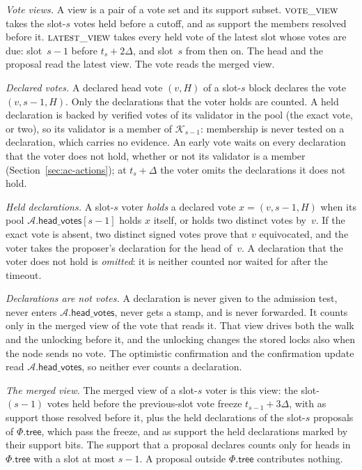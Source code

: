 \documentclass{article}
\newcommand{\committee}{\mathcal K}
\newcommand{\AC}{\mathcal A}
\newcommand{\Fr}{\Phi}
\newcommand{\tree}{\mathsf{tree}}
\newcommand{\headVotes}{\mathsf{head\_votes}}
\begin{document}
\emph{Vote views.}  A view is a pair of a vote set and its support subset.
$\Call{vote\_view}{}$ takes the slot-$s$ votes held before a cutoff, and as
support the members resolved before it.  $\Call{latest\_view}{}$ takes every
held vote of the latest slot whose votes are due: slot~$s-1$ before
$t_s+2\Delta$, and slot~$s$ from then on.  The head and the proposal read
the latest view.  The vote reads the merged view.

\emph{Declared votes.}  A declared head vote $(v,H)$ of a slot-$s$ block
declares the vote $(v,s-1,H)$.  Only the declarations that the voter holds
are counted.  A held declaration is backed by verified votes of its
validator in the pool (the exact vote, or two), so its validator is a member
of $\committee_{s-1}$: membership is never tested on a declaration, which
carries no evidence.  An early vote waits on
every declaration that the voter does not hold, whether or not its validator
is a member (Section~\ref{sec:ac-actions}); at $t_s+\Delta$ the voter omits
the declarations it does not hold.

\emph{Held declarations.}  A slot-$s$ voter \emph{holds} a declared vote
$x=(v,s-1,H)$ when its pool $\AC.\headVotes[s-1]$ holds $x$ itself, or holds
two distinct votes by~$v$.  If the exact vote is absent, two distinct
signed votes prove that $v$ equivocated, and the voter takes the
proposer's declaration for the head of~$v$.  A declaration that the
voter does not hold is \emph{omitted}: it is neither counted nor waited
for after the timeout.

\emph{Declarations are not votes.}  A declaration is never given to the
admission test, never enters $\AC.\headVotes$, never gets a stamp, and is
never forwarded.  It counts only in the merged view of the vote that reads
it.  That view drives both the walk and the unlocking before it, and the
unlocking changes the stored locks also when the node sends no vote.  The
optimistic confirmation and the confirmation update read $\AC.\headVotes$,
so neither ever counts a declaration.

\emph{The merged view.}  The merged view of a slot-$s$ voter is this view:
the slot-$(s-1)$ votes held before the previous-slot vote freeze
$t_{s-1}+3\Delta$, with as support those resolved before it, plus the
held declarations of the slot-$s$ proposals of $\Fr.\tree$, which pass
the freeze, and as support the held declarations marked by their support
bits.  The support that a proposal declares counts only for heads
in~$\Fr.\tree$ with a slot at most $s-1$.  A proposal outside $\Fr.\tree$
contributes nothing.
\end{document}
